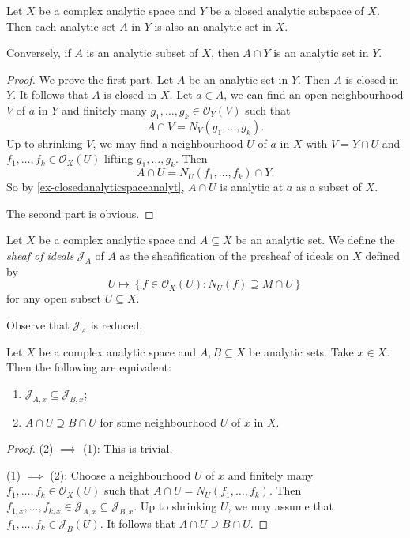 \begin{proposition}\label{prop-analyticsettrans}
    Let $X$ be a complex analytic space and $Y$ be a closed analytic subspace of $X$. Then each analytic set $A$ in $Y$ is also an analytic set in $X$. 

    Conversely, if $A$ is an analytic subset of $X$, then $A\cap Y$ is an analytic set in $Y$.
\end{proposition}
\begin{proof}
    We prove the first part. Let $A$ be an analytic set in $Y$. Then $A$ is closed in $Y$. It follows that $A$ is closed in $X$. Let $a\in A$, we can find an open neighbourhood $V$ of $a$ in $Y$ and finitely many $g_1,\ldots,g_k\in \mathcal{O}_Y(V)$ such that 
    \[
        A\cap V=N_V(g_1,\ldots,g_k).  
    \]
    Up to shrinking $V$, we may find a neighbourhood $U$ of $a$ in $X$ with $V=Y\cap U$ and $f_1,\ldots,f_k\in \mathcal{O}_X(U)$ lifting $g_1,\ldots,g_k$. Then 
    \[
        A\cap U=N_U(f_1,\ldots,f_k)\cap Y.  
    \]
    So by \cref{ex-closedanalyticspaceanalyt}, $A\cap U$ is analytic at $a$ as a subset of $X$.

    The second part is obvious.
\end{proof}

\begin{definition}\label{def-sheafidealanaset}
    Let $X$ be a complex analytic space and $A\subseteq X$ be an analytic set. We define the \emph{sheaf of ideals} $\mathcal{J}_A$ of $A$ as the sheafification of the presheaf of ideals on $X$ defined by 
    \[
        U\mapsto \left\{ f\in \mathcal{O}_X(U): N_U(f)\supseteq M\cap U \right\}
    \]
    for any open subset $U\subseteq X$.
\end{definition}
Observe that $\mathcal{J}_A$ is reduced.

\begin{lemma}\label{lma-germidealanalyticsetcont}
    Let $X$ be a complex analytic space and $A,B\subseteq X$ be analytic sets. Take $x\in X$. Then the following are equivalent:
    \begin{enumerate}
        \item $\mathcal{J}_{A,x}\subseteq \mathcal{J}_{B,x}$;
        \item $A\cap U\supseteq B\cap U$ for some neighbourhood $U$ of $x$ in $X$.
    \end{enumerate}
\end{lemma}
\begin{proof}
    (2) $\implies$ (1): This is trivial.

    (1) $\implies$ (2): Choose a neighbourhood $U$ of $x$ and finitely many $f_1,\ldots,f_k\in \mathcal{O}_X(U)$ such that $A\cap U=N_U(f_1,\ldots,f_k)$. Then $f_{1,x},\ldots,f_{k,x}\in \mathcal{J}_{A,x}\subseteq \mathcal{J}_{B,x}$. Up to shrinking $U$, we may assume that $f_1,\ldots,f_k\in \mathcal{J}_B(U)$. It follows that $A\cap U\supseteq B\cap U$.
\end{proof}



